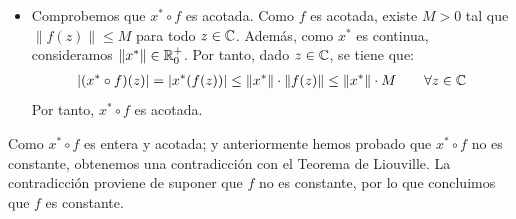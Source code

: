 \begin{ejercicio}
\begin{itemize}
        Por tanto, $x^* \circ f$ es entera y $(x^* \circ f)'(z_0) = x^*(f'(z_0))$.

        \item Comprobemos que $x^* \circ f$ es acotada. Como $f$ es acotada, existe $M > 0$ tal que $\|f(z)\| \leq M$ para todo $z \in \mathbb{C}$. Además, como $x^*$ es continua, consideramos $\|x^*\| \in \mathbb{R}^+_0$. Por tanto, dado $z \in \mathbb{C}$, se tiene que:
        \begin{align*}
            |(x^* \circ f)(z)| = |x^*(f(z))| \leq \|x^*\| \cdot \|f(z)\| \leq \|x^*\| \cdot M\qquad \forall z \in \mathbb{C}
        \end{align*}
        Por tanto, $x^* \circ f$ es acotada.
    \end{itemize}

    Como $x^* \circ f$ es entera y acotada; y anteriormente hemos probado que $x^* \circ f$ no es constante, obtenemos una contradicción con el Teorema de Liouville. La contradicción proviene de suponer que $f$ no es constante, por lo que concluimos que $f$ es constante.
\end{ejercicio}

